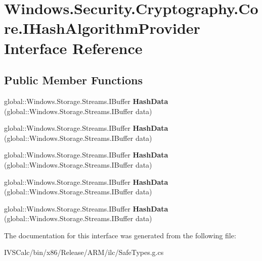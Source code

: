 \hypertarget{interface_windows_1_1_security_1_1_cryptography_1_1_core_1_1_i_hash_algorithm_provider}{}\section{Windows.\+Security.\+Cryptography.\+Core.\+I\+Hash\+Algorithm\+Provider Interface Reference}
\label{interface_windows_1_1_security_1_1_cryptography_1_1_core_1_1_i_hash_algorithm_provider}
\subsection*{Public Member Functions}
\begin{DoxyCompactItemize}
\item 
\mbox{\label{interface_windows_1_1_security_1_1_cryptography_1_1_core_1_1_i_hash_algorithm_provider_ae86de3469395aabd7fc2ea9a0b13a2c2}} 
global\+::\+Windows.\+Storage.\+Streams.\+I\+Buffer {\bfseries Hash\+Data} (global\+::\+Windows.\+Storage.\+Streams.\+I\+Buffer data)
\item 
\mbox{\label{interface_windows_1_1_security_1_1_cryptography_1_1_core_1_1_i_hash_algorithm_provider_ae86de3469395aabd7fc2ea9a0b13a2c2}} 
global\+::\+Windows.\+Storage.\+Streams.\+I\+Buffer {\bfseries Hash\+Data} (global\+::\+Windows.\+Storage.\+Streams.\+I\+Buffer data)
\item 
\mbox{\label{interface_windows_1_1_security_1_1_cryptography_1_1_core_1_1_i_hash_algorithm_provider_ae86de3469395aabd7fc2ea9a0b13a2c2}} 
global\+::\+Windows.\+Storage.\+Streams.\+I\+Buffer {\bfseries Hash\+Data} (global\+::\+Windows.\+Storage.\+Streams.\+I\+Buffer data)
\item 
\mbox{\label{interface_windows_1_1_security_1_1_cryptography_1_1_core_1_1_i_hash_algorithm_provider_ae86de3469395aabd7fc2ea9a0b13a2c2}} 
global\+::\+Windows.\+Storage.\+Streams.\+I\+Buffer {\bfseries Hash\+Data} (global\+::\+Windows.\+Storage.\+Streams.\+I\+Buffer data)
\item 
\mbox{\label{interface_windows_1_1_security_1_1_cryptography_1_1_core_1_1_i_hash_algorithm_provider_ae86de3469395aabd7fc2ea9a0b13a2c2}} 
global\+::\+Windows.\+Storage.\+Streams.\+I\+Buffer {\bfseries Hash\+Data} (global\+::\+Windows.\+Storage.\+Streams.\+I\+Buffer data)
\end{DoxyCompactItemize}


The documentation for this interface was generated from the following file\+:\begin{DoxyCompactItemize}
\item 
I\+V\+S\+Calc/bin/x86/\+Release/\+A\+R\+M/ilc/Safe\+Types.\+g.\+cs\end{DoxyCompactItemize}
